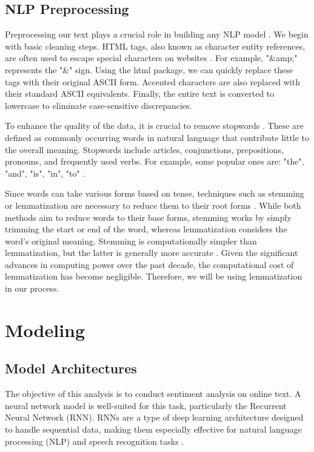 \documentclass{article}
\begin{document}
\begin{multicols}{2}
\subsection{NLP Preprocessing}   

Preprocessing our text plays a crucial role in building any NLP model \cite{kannan2014preprocessing}. We begin with basic cleaning steps. HTML tags, also known as character entity references, are often used to escape special characters on websites \cite{raggett1997html}. For example, "\&amp;" represents the "\&" sign. Using the html package, we can quickly replace these tags with their original ASCII form. Accented characters are also replaced with their standard ASCII equivalents. Finally, the entire text is converted to lowercase to eliminate case-sensitive discrepancies.

To enhance the quality of the data, it is crucial to remove stopwords \cite{ghag2015}. These are defined as commonly occurring words in natural language that contribute little to the overall meaning.  Stopwords include articles, conjunctions, prepositions, pronouns, and frequently used verbs. For example, some popular ones are: "the", "and", "is", "in", "to" \cite{sarica2021}.

Since words can take various forms based on tense, techniques such as stemming or lemmatization are necessary to reduce them to their root forms \cite{stanford_nlp_stemming_lemmatization}. While both methods aim to reduce words to their base forms, stemming works by simply trimming the start or end of the word, whereas lemmatization considers the word's original meaning. Stemming is computationally simpler than lemmatization, but the latter is generally more accurate \cite{khyani2021interpretation}. Given the significant advances in computing power over the past decade, the computational cost of lemmatization has become negligible. Therefore, we will be using lemmatization in our process.

\section{Modeling}

\subsection{Model Architectures}

The objective of this analysis is to conduct sentiment analysis on online text. A neural network model is well-suited for this task, particularly the Recurrent Neural Network (RNN). RNNs are a type of deep learning architecture designed to handle sequential data, making them especially effective for natural language processing (NLP) and speech recognition tasks \cite{shervine_rnn_cheatsheet}.



\end{multicols}
\end{document}
